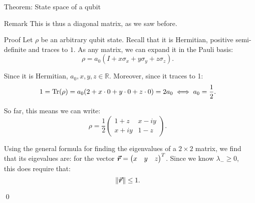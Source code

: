 \documentclass[a4paper]{article}
\begin{document}
\begin{parag}{Theorem: State space of a qubit}
\begin{subparag}{Remark}
        This is thus a diagonal matrix, as we saw before. 
    \end{subparag}
    
    \begin{subparag}{Proof}
        Let $\rho$ be an arbitrary qubit state. Recall that it is Hermitian, positive semi-definite and traces to $1$. As any matrix, we can expand it in the Pauli basis: 
        \[\rho = a_0 \left(I + x \sigma_x + y \sigma_y + z \sigma_z\right).\]
        
        Since it is Hermitian, $a_0, x, y, z \in \mathbb{R}$. Moreover, since it traces to 1: 
        \[1 = \Tr\left(\rho\right) = a_0\left(2 + x\cdot 0+y\cdot 0 + z\cdot 0\right) = 2a_0 \iff a_0 = \frac{1}{2}.\]
        
        So far, this means we can write: 
        \[\rho = \frac{1}{2} \begin{pmatrix} 1 + z & x - iy \\ x+ iy & 1 - z \end{pmatrix}.\]
        
        Using the general formula for finding the eigenvalues of a $2\times2$ matrix, we find that its eigevalues are: 
        for the vector $\bm{\protect\vec{r}} = \begin{pmatrix} x & y & z \end{pmatrix}^T$. Since we know $\lambda_{-} \geq 0$, this does require that: 
        \[\left\|\bvec{r}\right\| \leq 1.\]

        \qed
    \end{subparag}
\end{parag}
\end{document}
